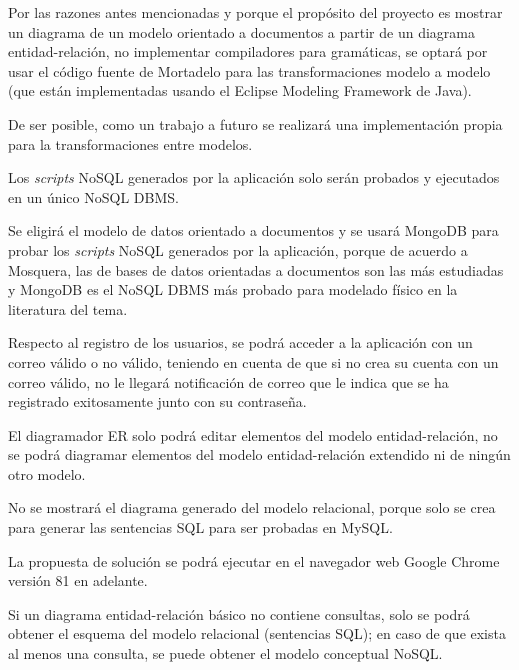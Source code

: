 Por las razones antes mencionadas y porque el propósito del proyecto es mostrar un diagrama de un modelo orientado a documentos a partir de un diagrama entidad-relación, no implementar compiladores para gramáticas, se optará por usar el código fuente de Mortadelo para las transformaciones modelo a modelo (que están implementadas usando el Eclipse Modeling Framework\cite{steinberg_emf_2008} de Java).


De ser posible, como un trabajo a futuro se realizará una implementación propia para la transformaciones entre modelos. 


Los \textit{scripts} NoSQL generados por la aplicación solo serán probados y ejecutados en un único NoSQL DBMS.


Se eligirá el modelo de datos orientado a documentos y se usará MongoDB para probar los \textit{scripts} NoSQL generados por la aplicación, porque de acuerdo a Mosquera\cite{martinez-mosquera_modeling_2020}, las de bases de datos orientadas a documentos son las más estudiadas y MongoDB es el NoSQL DBMS más probado para modelado físico en la literatura del tema.


Respecto al registro de los usuarios, se podrá acceder a la aplicación con un correo válido o no válido, teniendo en cuenta de que si no crea su cuenta con un correo válido, no le llegará notificación de correo que le indica que se ha registrado exitosamente junto con su contraseña.


El diagramador ER solo podrá editar elementos del modelo entidad-relación, no se podrá diagramar elementos del modelo entidad-relación extendido ni de ningún otro modelo.


No se mostrará el diagrama generado del modelo relacional, porque solo se crea para generar las sentencias SQL para ser probadas en MySQL.


La propuesta de solución se podrá ejecutar en el navegador web Google Chrome versión 81 en adelante.


Si un diagrama entidad-relación básico no contiene consultas, solo se podrá obtener el esquema del modelo relacional (sentencias SQL); en caso de que exista al menos una consulta, se puede obtener el modelo conceptual NoSQL.
    